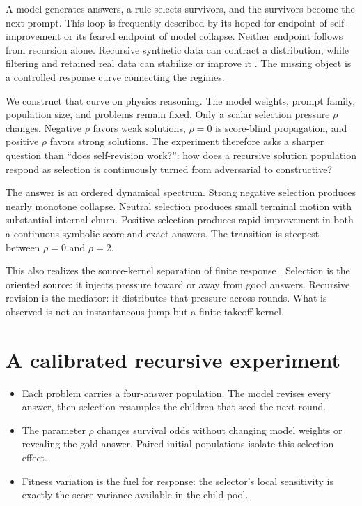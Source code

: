 \documentclass[10pt]{article}
\begin{document}
A model generates answers, a rule selects survivors, and the survivors become the next prompt. This loop is frequently described by its hoped-for endpoint of self-improvement or its feared endpoint of model collapse. Neither endpoint follows from recursion alone. Recursive synthetic data can contract a distribution, while filtering and retained real data can stabilize or improve it \cite{shumailov2024,kazdan2025}. The missing object is a controlled response curve connecting the regimes.

We construct that curve on physics reasoning. The model weights, prompt family, population size, and problems remain fixed. Only a scalar selection pressure $\rho$ changes. Negative $\rho$ favors weak solutions, $\rho=0$ is score-blind propagation, and positive $\rho$ favors strong solutions. The experiment therefore asks a sharper question than ``does self-revision work?'': how does a recursive solution population respond as selection is continuously turned from adversarial to constructive?

The answer is an ordered dynamical spectrum. Strong negative selection produces nearly monotone collapse. Neutral selection produces small terminal motion with substantial internal churn. Positive selection produces rapid improvement in both a continuous symbolic score and exact answers. The transition is steepest between $\rho=0$ and $\rho=2$.

This also realizes the source-kernel separation of finite response \cite{landersEntropy}. Selection is the oriented source: it injects pressure toward or away from good answers. Recursive revision is the mediator: it distributes that pressure across rounds. What is observed is not an instantaneous jump but a finite takeoff kernel.

\section{A calibrated recursive experiment}

\begin{conceptbox}
\begin{itemize}[leftmargin=1.15em,itemsep=0.18em,topsep=0.05em]
\item Each problem carries a four-answer population. The model revises every answer, then selection resamples the children that seed the next round.
\item The parameter $\rho$ changes survival odds without changing model weights or revealing the gold answer. Paired initial populations isolate this selection effect.
\item Fitness variation is the fuel for response: the selector's local sensitivity is exactly the score variance available in the child pool.
\end{itemize}
\end{conceptbox}
\end{document}
